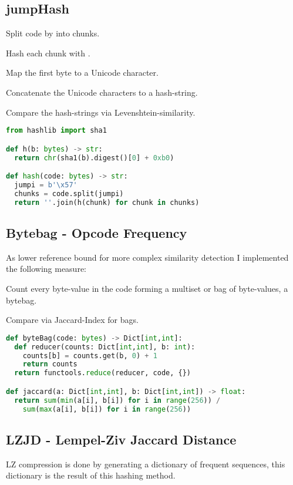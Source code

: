 \documentclass[../main.tex]{subfiles}
\begin{document}
\subsection{jumpHash}
\begin{ol}
  \item Split code by  into chunks.
  \item Hash each chunk with .
  \item Map the first byte to a Unicode character.
  \item Concatenate the Unicode characters to a hash-string.
  \item Compare the hash-strings via Levenshtein-similarity.
\end{ol}
\begin{lstlisting}[style=mystyle,language=Python]
from hashlib import sha1

def h(b: bytes) -> str:
  return chr(sha1(b).digest()[0] + 0xb0)

def hash(code: bytes) -> str:
  jumpi = b'\x57'
  chunks = code.split(jumpi)
  return ''.join(h(chunk) for chunk in chunks)
\end{lstlisting}

\subsection{Bytebag - Opcode Frequency}
As lower reference bound for more complex similarity detection I implemented the following measure:

\begin{ol}
  \item Count every byte-value in the code forming a multiset or bag of byte-values, a bytebag.
  \item Compare via Jaccard-Index for bags.
\end{ol}

\begin{lstlisting}[style=mystyle,language=Python]
def byteBag(code: bytes) -> Dict[int,int]:
  def reducer(counts: Dict[int,int], b: int):
    counts[b] = counts.get(b, 0) + 1
    return counts
  return functools.reduce(reducer, code, {})

def jaccard(a: Dict[int,int], b: Dict[int,int]) -> float:
  return sum(min(a[i], b[i]) for i in range(256)) /
    sum(max(a[i], b[i]) for i in range(256))
\end{lstlisting}

\subsection{LZJD - Lempel-Ziv Jaccard Distance}
LZ compression is done by generating a dictionary of frequent sequences, this dictionary is the result of this hashing method.
\end{document}
